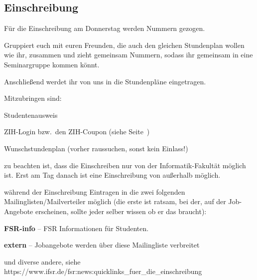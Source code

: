 \documentclass[a4paper,12pt]{report}
\begin{document}
\subsection{Einschreibung}
\begin{itemize*}
    \item Für die Einschreibung am Donnerstag werden Nummern gezogen.
    \item Gruppiert euch mit euren Freunden, die auch den gleichen Stundenplan wollen wie ihr, zusammen und zieht gemeinsam Nummern, sodass ihr gemeinsam in eine Seminargruppe kommen könnt.
    \item Anschließend werdet ihr von uns in die Stundenpläne eingetragen.
    \item Mitzubringen sind:
        \begin{itemize*}
        \item Studentenausweis
        \item ZIH-Login bzw.\ den ZIH-Coupon (siehe Seite~\pageref{rechentechnik})
        \item Wunschstundenplan (vorher raussuchen, sonst kein Einlass!)
        \item zu beachten ist, dass die Einschreiben nur von der Informatik-Fakultät möglich ist. Erst am Tag danach ist eine Einschreibung von außerhalb möglich.
    \end{itemize*}
    \item während der Einschreibung Eintragen in die zwei folgenden Mailinglisten/Mailverteiler möglich (die erste ist ratsam, bei der, auf der Job-Angebote erscheinen, sollte jeder selber wissen ob er das braucht):
        \begin{itemize*}
        \item \textbf{FSR-info} -- FSR Informationen für Studenten.
        \item \textbf{extern} -- Jobangebote werden über diese Mailingliste verbreitet
        \item und diverse andere, siehe \\ https://www.ifsr.de/fsr:news:quicklinks\_fuer\_die\_einschreibung
    \end{itemize*}
\end{itemize*}
\end{document}
